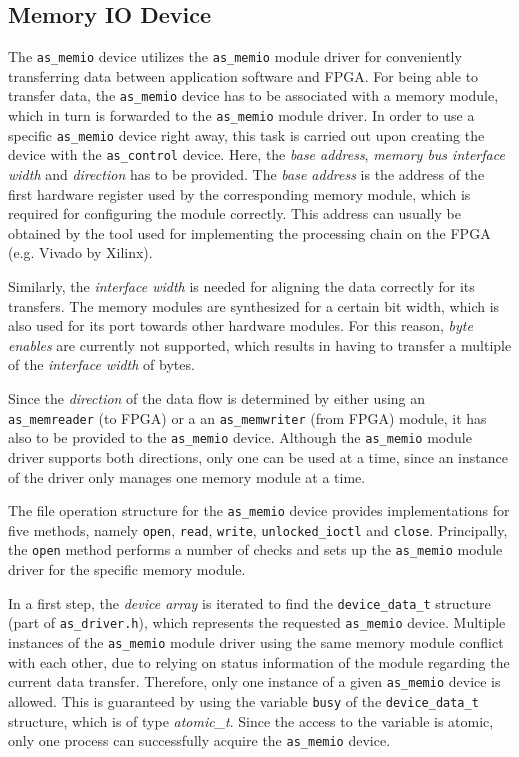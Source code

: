 \subsection{Memory IO Device}

The \texttt{as\_memio} device utilizes the \texttt{as\_memio} module driver for conveniently transferring data between application software and FPGA.
For being able to transfer data, the \texttt{as\_memio} device has to be associated with a memory module, which in turn is forwarded to the \texttt{as\_memio} module driver.
In order to use a specific \texttt{as\_memio} device right away, this task is carried out upon creating the device with the \texttt{as\_control} device.
Here, the \textit{base address}, \textit{memory bus interface width} and \textit{direction} has to be provided.
The \textit{base address} is the address of the first hardware register used by the corresponding memory module, which is required for configuring the module correctly.
This address can usually be obtained by the tool used for implementing the processing chain on the FPGA (e.g. Vivado by Xilinx).

Similarly, the \textit{interface width} is needed for aligning the data correctly for its transfers. 
The memory modules are synthesized for a certain bit width, which is also used for its port towards other hardware modules.
For this reason, \emph{byte enables} are currently not supported, which results in having to transfer a multiple of the \textit{interface width} of bytes.

Since the \textit{direction} of the data flow is determined by either using an \texttt{as\_memreader} (to FPGA) or a an \texttt{as\_memwriter} (from FPGA) module, it has also to be provided to the \texttt{as\_memio} device.
Although the \texttt{as\_memio} module driver supports both directions, only one can be used at a time, since an instance of the driver only manages one memory module at a time.

The file operation structure for the \texttt{as\_memio} device provides implementations for five methods, namely \texttt{open}, \texttt{read}, \texttt{write}, \texttt{unlocked\_ioctl} and \texttt{close}.
Principally, the \texttt{open} method performs a number of checks and sets up the \texttt{as\_memio} module driver for the specific memory module.

In a first step, the \textit{device array} is iterated to find the \texttt{device\_data\_t} structure (part of \texttt{as\_driver.h}), which represents the requested \texttt{as\_memio} device. 
Multiple instances of the \texttt{as\_memio} module driver using the same memory module conflict with each other, due to relying on status information of the module regarding the current data transfer.
Therefore, only one instance of a given \texttt{as\_memio} device is allowed.
This is guaranteed by using the variable \texttt{busy} of the \texttt{device\_data\_t} structure, which is of type \textit{atomic\_t}.
Since the access to the variable is atomic, only one process can successfully acquire the \texttt{as\_memio} device.

